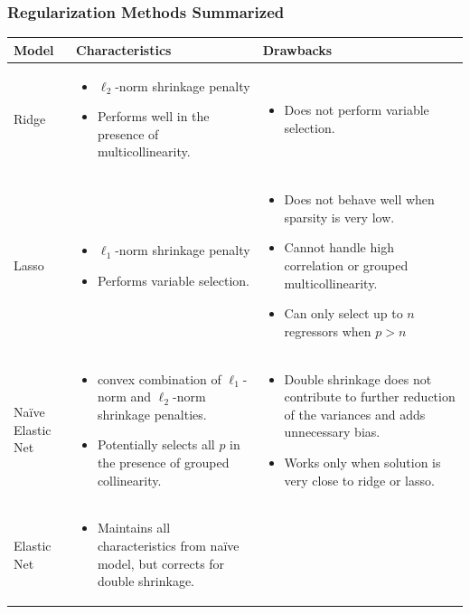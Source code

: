 \begin{frame}[fragile]
\frametitle{Regularization Methods Summarized}
\tiny
\begin{table}
\begin{tabular}[h]{ ||m{2cm}|m{5cm}|m{5cm}||  }
\hline
Model & Characteristics & Drawbacks \\
\hline\hline
Ridge
& 
\begin{itemize}
    \item $\ell_2$-norm shrinkage penalty %
    \item Performs well in the presence of multicollinearity.
\end{itemize}
& 
\begin{itemize}
    \item Does not perform variable selection.
\end{itemize} \\
\hline
Lasso
& 
\begin{itemize}
    \item  $\ell_1$-norm shrinkage penalty %
    \item Performs variable selection.
\end{itemize}
& 
\begin{itemize}
    \item Does not behave well when sparsity is very low.
    \item Cannot handle high correlation or grouped multicollinearity. 
    \item Can only select up to $n$ regressors when $p > n$
\end{itemize} \\
\hline
Naïve Elastic Net
& 
\begin{itemize}
    \item  convex combination of $\ell_1$-norm and $\ell_2$-norm shrinkage penalties. 
    \item Potentially selects all $p$ in the presence of grouped collinearity.
\end{itemize}
& 
\begin{itemize}
    \item Double shrinkage does not contribute to further reduction of the variances and adds unnecessary bias.
    \item Works only when solution is very close to ridge or lasso.
\end{itemize} \\
\hline
Elastic Net
&
\begin{itemize}
    \item Maintains all characteristics from naïve model, but corrects for double shrinkage.
\end{itemize}
&
\tabularnewline
\hline
\end{tabular}
\end{table}
\end{frame}
